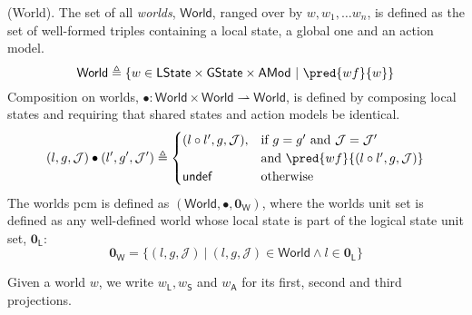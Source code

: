 \begin{defn}
	(World).
	The set of all \emph{worlds}, $\mathsf{World}$, ranged over by $w, w_1, \ldots w_n$, is defined as the set of well-formed triples containing a local state, a global one and an action model.
	\[
		\mathsf{World} \triangleq \{ w \in \mathsf{LState} \times \mathsf{GState} \times \mathsf{AMod}\ |\ \pred{wf}{w} \}
	\]
	Composition on worlds, $\bullet : \mathsf{World} \times \mathsf{World} \rightharpoonup \mathsf{World}$, is defined by composing local states and requiring that shared states and action models be identical.
	\[
		(l, g, \mathcal{J}) \bullet (l', g', \mathcal{J}') \triangleq
		\begin{cases}
			(l \circ l', g, \mathcal{J}), & \text{if } g = g' \text{ and } \mathcal{J} = \mathcal{J}' \\ & \text{and } \pred{wf}{(l \circ l', g, \mathcal{J})}
			\\
			\mathsf{undef} & \text{otherwise}
		\end{cases}
	\]
	The worlds pcm is defined as $(\mathsf{World}, \bullet, \mathbf{0}_\mathsf{W})$, where the worlds unit set is defined as any well-defined world whose local state is part of the logical state unit set, $\mathbf{0}_\mathsf{L}$:
	\[
		\mathbf{0}_\mathsf{W} = \{ (l, g, \mathcal{J})\ |\ (l, g, \mathcal{J}) \in \mathsf{World} \land l \in \mathbf{0}_\mathsf{L} \}
	\]
\end{defn}
Given a world $w$, we write $w_\mathsf{L}, w_\mathsf{S}$ and $w_\mathsf{A}$ for its first, second and third projections.